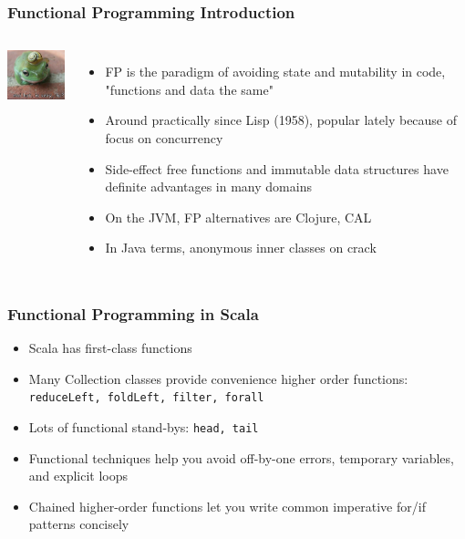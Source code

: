 \begin{frame} 
\frametitle{Functional Programming Introduction}
\begin{columns}[c]
  \column{0.5in}
    \includegraphics[width=1.0in]{graphics/hat.png} 
  \column{2.5in}
    \begin{itemize}
      \item<1-> FP is the paradigm of avoiding state and mutability in code, "functions and data the same"
      \item<2-> Around practically since Lisp (1958), popular lately because of focus on concurrency
      \item<3-> Side-effect free functions and immutable data structures have definite advantages in many domains
      \item<4-> On the JVM, FP alternatives are Clojure, CAL
      \item<5-> In Java terms, anonymous inner classes on crack
    \end{itemize}
\end{columns}
\end{frame} 

\begin{frame} 
\frametitle{Functional Programming in Scala}
\begin{itemize}
  \item<1-> Scala has first-class functions
  \item<2-> Many Collection classes provide convenience higher order functions: \tt\small{reduceLeft, foldLeft, filter, forall}
  \item<3-> Lots of functional stand-bys: \tt\small{head, tail}
  \item<4-> Functional techniques help you avoid off-by-one errors, temporary variables, and explicit loops
  \item<5-> Chained higher-order functions let you write common imperative for/if patterns concisely
\end{itemize}
\end{frame} 

